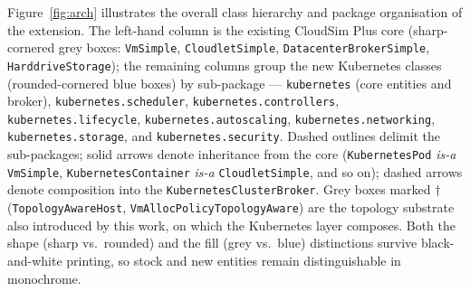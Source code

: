 \documentclass[ASNA,twocolumn]{USG}
\begin{document}
    Figure~\ref{fig:arch} illustrates the overall class hierarchy and
    package organisation of the extension. The left-hand column is the
    existing CloudSim Plus core (sharp-cornered grey boxes:
    \texttt{VmSimple}, \texttt{CloudletSimple},
    \texttt{DatacenterBrokerSimple}, \texttt{HarddriveStorage}); the
    remaining columns group the new Kubernetes classes (rounded-cornered
    blue boxes) by sub-package --- \texttt{kubernetes} (core entities and
    broker), \texttt{kubernetes.scheduler}, \texttt{kubernetes.controllers},
    \texttt{kubernetes.lifecycle}, \texttt{kubernetes.autoscaling},
    \texttt{kubernetes.networking}, \texttt{kubernetes.storage}, and
    \texttt{kubernetes.security}. Dashed outlines delimit the sub-packages;
    solid arrows denote inheritance from the core (\texttt{KubernetesPod}
    \emph{is-a} \texttt{VmSimple}, \texttt{KubernetesContainer} \emph{is-a}
    \texttt{CloudletSimple}, and so on); dashed arrows denote composition
    into the \texttt{KubernetesClusterBroker}. Grey boxes marked $\dagger$
    (\texttt{TopologyAwareHost}, \texttt{VmAllocPolicyTopologyAware}) are
    the topology substrate also introduced by this work, on which the
    Kubernetes layer composes. Both the shape (sharp vs.\ rounded) and the
    fill (grey vs.\ blue) distinctions survive black-and-white printing, so
    stock and new entities remain distinguishable in monochrome.
\end{document}

